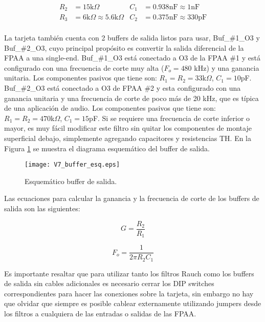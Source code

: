 	\vspace{-1cm}
	\begin{align*}
		R_{2}	&=	15\mathrm{k}\Omega		& C_{1}	&=	0.938\mathrm{nF} \approx	1\mathrm{nF}\\
		R_{3}	&=	6\mathrm{k}\Omega \approx	5.6\mathrm{k}\Omega		& C_{2}	&=	0.375\mathrm{nF} \approx	330\mathrm{pF}\\
	\end{align*}	
	
	\vspace{-1cm}
	La tarjeta también cuenta con 2 buffers de salida listos para usar, Buf\_\#1\_O3 y Buf\_\#2\_O3, cuyo principal propósito es convertir la salida diferencial de la FPAA a una single-end. 
	Buf\_\#1\_O3 está conectado a O3 de la FPAA \#1 y está configurado con una frecuencia de corte muy alta ($F_{o} = 480$ kHz) y una ganancia unitaria. Los componentes pasivos que tiene son: $R_{1} = R_{2} = 33$k$\Omega$, $C_{1} = 10$pF. Buf\_\#2\_O3 está conectado a O3 de FPAA \#2 y esta configurado con una ganancia unitaria y una frecuencia de corte de poco más de 20 kHz, que es típica de una aplicación de audio. Los componentes pasivos que tiene son: $R_{1} = R_{2} = 470$k$\Omega$, $C_{1} = 15$pF. Si se requiere una frecuencia de corte inferior o mayor, es muy fácil modificar este filtro sin quitar los componentes de montaje superficial debajo, simplemente agregando capacitores y resistencias TH. En la Figura \ref{fig:V7_buffer_esq} se muestra el diagrama esquemático del buffer de salida.
	\begin{figure}[!hbp] 
		\caption{Esquemático buffer de salida.}
		\label{fig:V7_buffer_esq}
		\centering
		\texttt{[image: V7\_buffer\_esq.eps]}
	\end{figure}
	
	Las ecuaciones para calcular la ganancia y la frecuencia de corte de los buffers de salida son las siguientes:
	
	\begin{equation}
		G = \frac{R_{2}}{R_{1}}
	\end{equation}
	
	\begin{equation}
		F_{o} = \frac{1}{2 \pi R_{2} C_{1}}
	\end{equation}
	
	Es importante resaltar que para utilizar tanto los filtros Rauch como los buffers de salida sin cables adicionales es necesario cerrar los DIP switches correspondientes para hacer las conexiones sobre la tarjeta, sin embargo no hay que olvidar que siempre es posible cablear externamente utilizando jumpers desde los filtros a cualquiera de las entradas o salidas de las FPAA.
	

